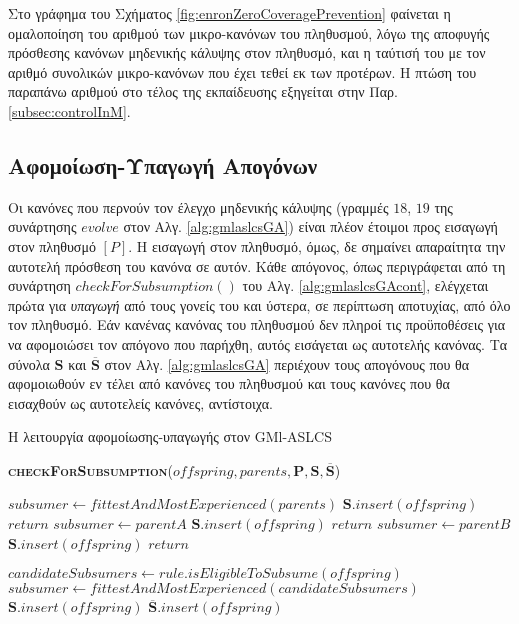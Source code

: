 Στο γράφημα του Σχήματος \ref{fig:enronZeroCoveragePrevention} φαίνεται η ομαλοποίηση του αριθμού των μικρο-κανόνων του πληθυσμού, λόγω της αποφυγής πρόσθεσης κανόνων μηδενικής κάλυψης στον πληθυσμό, και η ταύτισή του με τον αριθμό συνολικών μικρο-κανόνων που έχει τεθεί εκ των προτέρων. Η πτώση του παραπάνω αριθμού στο τέλος της εκπαίδευσης εξηγείται στην Παρ. \ref{subsec:controlInM}. 






\subsection{Αφομοίωση-Υπαγωγή Απογόνων}
\label{subsec:subsumptionAndInsertion}
Οι κανόνες που περνούν τον έλεγχο μηδενικής κάλυψης (γραμμές $18$, $19$ της συνάρτησης $evolve$ στον Αλγ. \ref{alg:gmlaslcsGA}) είναι πλέον έτοιμοι προς εισαγωγή στον πληθυσμό $[P]$. Η εισαγωγή στον πληθυσμό, όμως, δε σημαίνει απαραίτητα την αυτοτελή πρόσθεση του κανόνα σε αυτόν. Κάθε απόγονος, όπως περιγράφεται από τη συνάρτηση $checkForSubsumption()$ του Αλγ. \ref{alg:gmlaslcsGAcont}, ελέγχεται πρώτα για \emph{υπαγωγή} από τους γονείς του και ύστερα, σε περίπτωση αποτυχίας, από όλο τον πληθυσμό. Εάν κανένας κανόνας του πληθυσμού δεν πληροί τις προϋποθέσεις για να αφομοιώσει τον απόγονο που παρήχθη, αυτός εισάγεται ως αυτοτελής κανόνας. Τα σύνολα $\textbf{S}$ και $\overline{\textbf{S}}$ στον Αλγ. \ref{alg:gmlaslcsGA} περιέχουν τους απογόνους που θα αφομοιωθούν εν τέλει από κανόνες του πληθυσμού και τους κανόνες που θα εισαχθούν ως αυτοτελείς κανόνες, αντίστοιχα.


\begin{algorithm}
 	\caption{Η λειτουργία αφομοίωσης-υπαγωγής στον GMl-ASLCS}
	\label{alg:gmlaslcsGAcont}
 
  	\begin{algorithmic}[1]
  		\STATE \textbf{\textsc{checkForSubsumption}}($offspring, parents, \textbf{P}, \textbf{S}, \overline{\textbf{S}}$)

  			\STATE $subsumer \gets fittestAndMostExperienced(parents)$
  			\STATE $\textbf{S}.insert(offspring)$
  			\STATE $return$
		\ELSE
				\STATE $subsumer \gets parentA$
				\STATE $\textbf{S}.insert(offspring)$
				\STATE $return$
			\ENDIF 
				\STATE $subsumer \gets parentB$
				\STATE $\textbf{S}.insert(offspring)$
				\STATE $return$
    		\ENDIF
    		
    			\STATE $candidateSubsumers \gets rule.isEligibleToSubsume(offspring)$
    		\ENDFOR 
    		\STATE $subsumer \gets fittestAndMostExperienced(candidateSubsumers)$
    			\STATE $\textbf{S}.insert(offspring)$
    		\ELSE
    			\STATE $\overline{\textbf{S}}.insert(offspring)$	
    		\ENDIF	
    			
  		\ENDIF

     \end{algorithmic}
\end{algorithm} 

